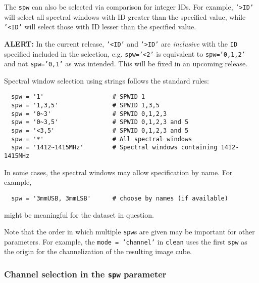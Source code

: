 The {\tt spw} can also be selected via comparison for
integer IDs.  For example, {\tt '>ID'} will select all spectral
windows with ID greater than the specified value, while {\tt '<ID'}
will select those with ID lesser than the specified value.

{\bf ALERT:} In the current release, {\tt '<ID'} and
{\tt '>ID'} are {\em inclusive} with the {\tt ID} specified included
in the selection, e.g. {\tt spw='<2'} is equivalent to 
{\tt spw='0,1,2'} and not {\tt spw='0,1'} as was intended.  This will
be fixed in an upcoming release.

Spectral window selection using strings follows the standard rules:
\small
\begin{verbatim}
  spw = '1'                   # SPWID 1
  spw = '1,3,5'               # SPWID 1,3,5
  spw = '0~3'                 # SPWID 0,1,2,3
  spw = '0~3,5'               # SPWID 0,1,2,3 and 5
  spw = '<3,5'                # SPWID 0,1,2,3 and 5
  spw = '*'                   # All spectral windows
  spw = '1412~1415MHz'        # Spectral windows containing 1412-1415MHz
\end{verbatim}
\normalsize


In some cases, the spectral windows may allow specification by name.
For example,
\small
\begin{verbatim}
  spw = '3mmUSB, 3mmLSB'      # choose by names (if available)
\end{verbatim}
\normalsize
might be meaningful for the dataset in question.

Note that the order in which multiple {\tt spw}s are given may be
important for other parameters.
For example, the {\tt mode = 'channel'} in {\tt clean} uses the
first {\tt spw} as the origin for the channelization of the resulting
image cube.

\subsubsection{Channel selection in the {\tt spw} parameter}
\label{section:io.selection.spw.channel}

